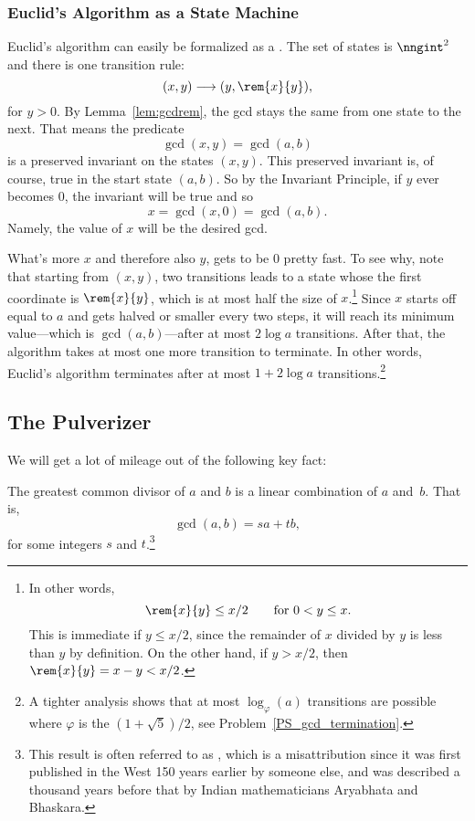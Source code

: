 \subsubsection{Euclid's Algorithm as a State Machine}
Euclid's algorithm can easily be formalized as a .  The set of states is $\nngint^2$ and there is one
transition rule:
\begin{equation}\label{euclid_transition}
(x,y) \movesto (y, \rem{x}{y}),
\end{equation}
for $y>0$.  By Lemma~\ref{lem:gcdrem}, the gcd stays the same from one
state to the next.  That means the predicate
\[
\gcd(x,y) = \gcd(a,b)
\]
is a preserved invariant on the states $(x,y)$.  This preserved
invariant is, of course, true in the start state $(a,b)$.  So by the
Invariant Principle, if $y$ ever becomes $0$, the invariant will be
true and so
\[
x = \gcd(x,0) = \gcd(a,b).
\]
Namely, the value of $x$ will be the desired gcd.

What's more $x$ and therefore also $y$, gets to be 0 pretty fast.
To see why, note that starting from $(x,y)$, two transitions leads to
a state whose the first coordinate is $\rem{x}{y}$, which is at most
half the size of $x$.\footnote{In other words,
\begin{equation}\label{rxylx2}
\rem{x}{y} \le x/2 \qquad \text{for $0 < y \le x$}.
\end{equation}
This is immediate if $y \le x/2$, since the remainder of $x$ divided
by $y$ is less than $y$ by definition.  On the other hand, if $y >
x/2$, then $\rem{x}{y} = x - y < x/2$.}  Since $x$ starts off equal to
$a$ and gets halved or smaller every two steps, it will reach its
minimum value---which is $\gcd(a,b)$---after at most $2 \log a$
transitions.  After that, the algorithm takes at most one more
transition to terminate.  In other words, Euclid's algorithm
terminates after at most $1+2 \log a$ transitions.\footnote{A tighter
  analysis shows that at most $\log_\varphi(a)$ transitions are
  possible where $\varphi$ is the  $(1 +
  \sqrt{5})/2$, see Problem~\ref{PS_gcd_termination}.}

\subsection{The Pulverizer}\label{sec:pulverizer}
We will get a lot of mileage out of the following key fact:
\begin{theorem}\label{gcd_is_lin_thm}
The greatest common divisor of $a$ and $b$ is a linear combination of
$a$ and~$b$.  That is,
\[
\gcd(a, b) = s a + t b,
\]
for some integers $s$ and $t$.\footnote{This result is often referred
  to as \emph{}, which is a misattribution since
  it was first published in the West 150 years earlier by someone
  else, and was described a thousand years before that by Indian
  mathematicians Aryabhata and Bhaskara.}
\end{theorem}

